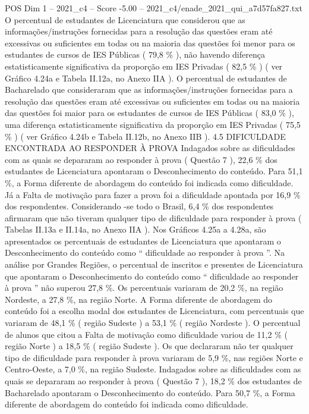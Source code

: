 \begin{textsample}{POS Dim 1 – 2021\_c4 – Score -5.00 – 2021\_c4/enade\_2021\_qui\_a7d57fa827.txt}
O percentual de estudantes de Licenciatura que considerou que as informações/instruções fornecidas para a resolução das questões eram até excessivas ou suficientes em todas ou na maioria das questões foi menor para os estudantes de cursos de IES Públicas ( 79,8 \% ), não havendo diferença estatisticamente significativa da proporção em IES Privadas ( 82,5 \% ) ( ver Gráfico 4.24a e Tabela II.12a, no Anexo IIA ).
O percentual de estudantes de Bacharelado que consideraram que as informações/instruções fornecidas para a resolução das questões eram até excessivas ou suficientes em todas ou na maioria das questões foi maior para os estudantes de cursos de IES Públicas ( 83,0 \% ), uma diferença estatisticamente significativa da proporção em IES Privadas ( 75,5 \% ) ( ver Gráfico 4.24b e Tabela II.12b, no Anexo IIB ). 4.5 DIFICULDADE ENCONTRADA AO RESPONDER À PROVA Indagados sobre as dificuldades com as quais se depararam ao responder à prova ( Questão 7 ), 22,6 \% dos estudantes de Licenciatura apontaram o Desconhecimento do conteúdo.
Para 51,1 \%, a Forma diferente de abordagem do conteúdo foi indicada como dificuldade.
Já a Falta de motivação para fazer a prova foi a dificuldade apontada por 16,9 \% dos respondentes.
Considerando -se todo o Brasil, 6,4 \% dos respondentes afirmaram que não tiveram qualquer tipo de dificuldade para responder à prova ( Tabelas II.13a e II.14a, no Anexo IIA ).
Nos Gráficos 4.25a a 4.28a, são apresentados os percentuais de estudantes de Licenciatura que apontaram o Desconhecimento do conteúdo como “ dificuldade ao responder à prova ”.
Na análise por Grandes Regiões, o percentual de inscritos e presentes de Licenciatura que apontaram o Desconhecimento do conteúdo como “ dificuldade ao responder à prova ” não superou 27,8 \%.
Os percentuais variaram de 20,2 \%, na região Nordeste, a 27,8 \%, na região Norte.
A Forma diferente de abordagem do conteúdo foi a escolha modal dos estudantes de Licenciatura, com percentuais que variaram de 48,1 \% ( região Sudeste ) a 53,1 \% ( região Nordeste ).
O percentual de alunos que citou a Falta de motivação como dificuldade variou de 11,2 \% ( região Norte ) a 18,5 \% ( região Sudeste ).
Os que declararam não ter qualquer tipo de dificuldade para responder à prova variaram de 5,9 \%, nas regiões Norte e Centro-Oeste, a 7,0 \%, na região Sudeste.
Indagados sobre as dificuldades com as quais se depararam ao responder à prova ( Questão 7 ), 18,2 \% dos estudantes de Bacharelado apontaram o Desconhecimento do conteúdo.
Para 50,7 \%, a Forma diferente de abordagem do conteúdo foi indicada como dificuldade.

\end{textsample}
